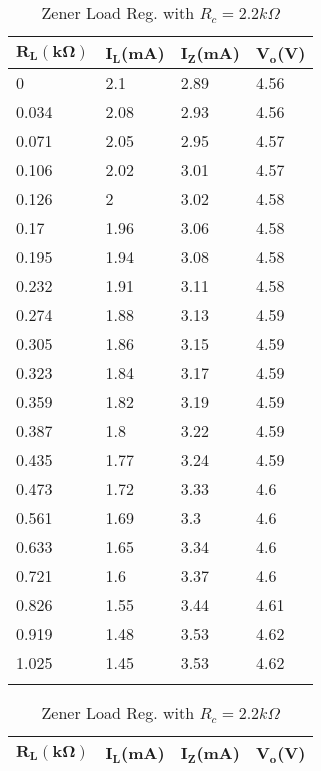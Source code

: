 \documentclass{scrartcl}
\newcommand{\1}{\mathbbm{1}}
\begin{document}
\begin{table}[!htb]
    \begin{minipage}{.45\linewidth}
		\centering
			\begin{tabular}{|l|l|l|l|}
			\hline
				\textbf{$\pmb{R_L(k\Omega)}$} & \textbf{$\pmb{I_L}$(mA)} & 
				\textbf{$\pmb{I_Z}$(mA)} & \textbf{$\pmb{V_o}$(V)} \\ \hline
				0 & 2.1 & 2.89 & 4.56 \\ \hline
				0.034 & 2.08 & 2.93 & 4.56 \\ \hline
				0.071 & 2.05 & 2.95 & 4.57 \\ \hline
				0.106 & 2.02 & 3.01 & 4.57 \\ \hline
				0.126 & 2 & 3.02 & 4.58 \\ \hline
				0.17 & 1.96 & 3.06 & 4.58 \\ \hline
				0.195 & 1.94 & 3.08 & 4.58 \\ \hline
				0.232 & 1.91 & 3.11 & 4.58 \\ \hline
				0.274 & 1.88 & 3.13 & 4.59 \\ \hline
				0.305 & 1.86 & 3.15 & 4.59 \\ \hline
				0.323 & 1.84 & 3.17 & 4.59 \\ \hline
				0.359 & 1.82 & 3.19 & 4.59 \\ \hline
				0.387 & 1.8 & 3.22 & 4.59 \\ \hline
				0.435 & 1.77 & 3.24 & 4.59 \\ \hline
				0.473 & 1.72 & 3.33 & 4.6 \\ \hline
				0.561 & 1.69 & 3.3 & 4.6 \\ \hline
				0.633 & 1.65 & 3.34 & 4.6 \\ \hline
				0.721 & 1.6 & 3.37 & 4.6 \\ \hline
				0.826 & 1.55 & 3.44 & 4.61 \\ \hline
				0.919 & 1.48 & 3.53 & 4.62 \\ \hline
				1.025 & 1.45 & 3.53 & 4.62 \\ \hline
			\label{tab:ZDload2.2ohm}
			\end{tabular}
			\caption{Zener Load Reg. with $R_c = 2.2 k\Omega$}
    \end{minipage}%
    \begin{minipage}{.5\linewidth}
      \centering
    \begin{tabular}{|l|l|l|l|}
    \hline
        \textbf{$\pmb{R_L(k\Omega)}$} & \textbf{$\pmb{I_L}$(mA)} 
		& \textbf{$\pmb{I_Z}$(mA)} & \textbf{$\pmb{V_o}$(V)} \\ \hline

\end{tabular}
\end{minipage}
\end{table}
\end{document}
